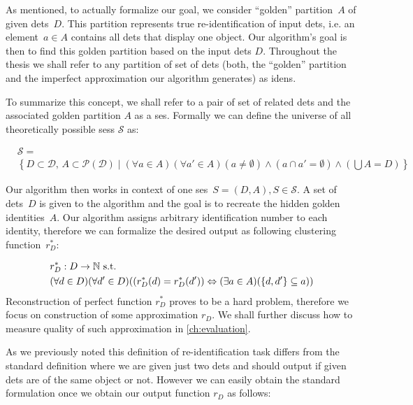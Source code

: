 As mentioned, to actually formalize our goal, we consider ``golden'' partition~$A$ of given \glspl{det}~$D$. This partition represents true re-identification of input \glspl{det}, i.e. an element~$a \in A$ contains all \glspl{det} that display one object. Our algorithm's goal is then to find this golden partition based on the input \glspl{det} $D$. Throughout the thesis we shall refer to any partition of set of \glspl{det} (both, the ``golden'' partition and the imperfect approximation our algorithm generates) as \glspl{iden}.



To summarize this concept, we shall refer to a pair of set of related \glspl{det} and the associated golden partition $A$ as a \gls{ses}. Formally we can define the universe of all theoretically possible \glspl{ses} $\mathcal{S}$ as:

\begin{equation*}
\begin{split}
&\mathcal{S} =\\& \left\{D \subset \mathcal{D},\,A \subset \mathcal{P(D)} \mid (\forall a \in A) (\forall a' \in A) (a \neq \emptyset) \land (a \cap a' = \emptyset) \land \left(\bigcup A = D\right)\right\}    
\end{split}
\end{equation*}


Our algorithm then works in context of one \gls{ses}~$S = (D, A), S \in \mathcal{S}$. A set of \glspl{det}~$D$ is given to the  algorithm and the goal is to recreate the hidden golden identities~$A$. Our algorithm assigns arbitrary identification number to each identity, therefore we can formalize the desired output as following clustering function~$r_D^*$:

\begin{equation}
\begin{split}
&r_D^*: D \rightarrow \mathbb{N} \text{ s.t. }\\
&(\forall d \in D) (\forall d' \in D) ((r_D^*(d) = r_D^*(d')) \Leftrightarrow (\exists a \in A) (\{d, d'\} \subseteq a))
\label{eq:reidentification}
\end{split}
\end{equation}
Reconstruction of perfect function $r_D^*$ proves to be a hard problem, 
therefore we focus on construction of some approximation $r_D$. We shall further discuss how to measure quality of such approximation in
\autoref{ch:evaluation}. 

As we previously noted this definition of re-identification task differs from the standard definition where we are given just two \glspl{det} and should output if given \glspl{det} are of the same object or not. However we can easily obtain the standard formulation once we obtain our output function $r_D$ as follows:


